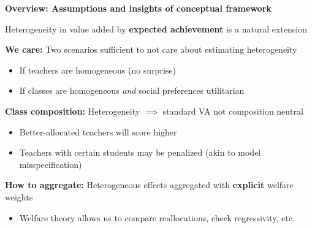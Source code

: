 \documentclass[t,aspectratio=169,11pt,presentation]{beamer}
\newenvironment{wideitemize}{\itemize\addtolength{\itemsep}{14pt}}{\enditemize}
\begin{document}
\begin{frame}{\textbf{Overview: Assumptions and insights of conceptual framework}}


\begin{wideitemize}
    \item Heterogeneity in value added by {\textbf{expected achievement}} is a natural extension
        
    {\tiny \color{gray} \citep{lockwood2009,condie2014teacher,Delgado2020,bates2022teacher}}

    \item<2-> {\textbf{We care:}} Two scenarios sufficient to not care about estimating heterogeneity
      \begin{itemize}
        \item If teachers are homogeneous (no surprise)
        \item If classes are homogeneous \textit{and} social preferences utilitarian

        
    \end{itemize}
    \item<3-> {\textbf{Class composition:}} Heterogeneity $\implies$ standard VA not composition neutral
      \begin{itemize}
        \item Better-allocated teachers will score higher 
        \item Teachers with certain students may be penalized (akin to model misspecification)
                
    \end{itemize}
    
    \item<4-> {\textbf{How to aggregate:}} Heterogeneous effects aggregated with \textbf{explicit} welfare weights
      \begin{itemize}
        \item  Welfare theory allows us to compare reallocations, check regressivity, etc.
        
    \end{itemize} 
\end{wideitemize}


        \hyperlink{ex1}{}
        \hyperlink{ex2}{}   
\end{frame}



\end{document}
